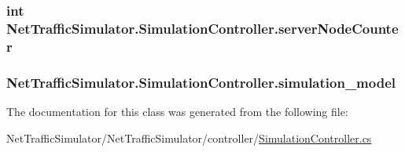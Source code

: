 \hypertarget{classNetTrafficSimulator_1_1SimulationController_a59a626f2fc2b81873ef548f2d7d04948}{
\subsubsection[{server\-Node\-Counter}]{\setlength{\rightskip}{0pt plus 5cm}int Net\-Traffic\-Simulator.\-Simulation\-Controller.\-server\-Node\-Counter\hspace{0.3cm}{\ttfamily [private]}}}\label{classNetTrafficSimulator_1_1SimulationController_a59a626f2fc2b81873ef548f2d7d04948}
\hypertarget{classNetTrafficSimulator_1_1SimulationController_a26441a135203881caae479f93f17e288}{
\subsubsection[{simulation\-\_\-model}]{ Net\-Traffic\-Simulator.\-Simulation\-Controller.\-simulation\-\_\-model\hspace{0.3cm}{\ttfamily [private]}}}\label{classNetTrafficSimulator_1_1SimulationController_a26441a135203881caae479f93f17e288}


The documentation for this class was generated from the following file\-:\begin{DoxyCompactItemize}
\item 
Net\-Traffic\-Simulator/\-Net\-Traffic\-Simulator/controller/\hyperlink{SimulationController_8cs}{Simulation\-Controller.\-cs}\end{DoxyCompactItemize}

